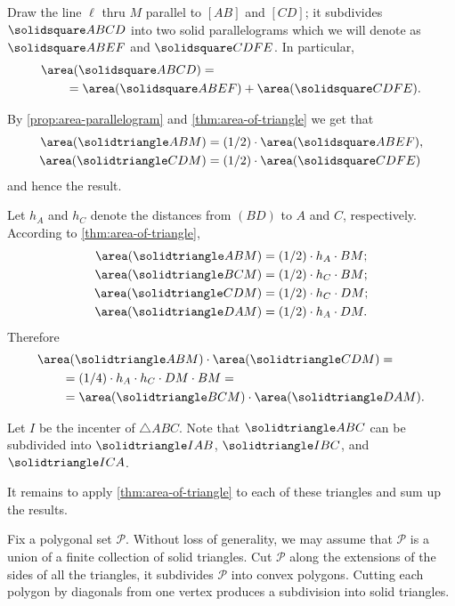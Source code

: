 Draw the line $\ell$ 
thru $M$ parallel to $[AB]$ and $[CD]$;
it subdivides $\solidsquare ABCD$ into two solid parallelograms
which we will denote as
$\solidsquare ABEF$ and
$\solidsquare CDFE$.
In particular,
\begin{align*}
&\area(\solidsquare ABCD)=
\\
&\qquad=
\area(\solidsquare ABEF)+\area(\solidsquare CDFE).
\end{align*}

By \ref{prop:area-parallelogram} and \ref{thm:area-of-triangle} we get that 
\begin{align*}
\area(\solidtriangle ABM)&=\tfrac12\cdot\area(\solidsquare ABEF),
\\
\area(\solidtriangle CDM)&=\tfrac12\cdot\area(\solidsquare CDFE)
\end{align*}
and hence the result.

Let $h_A$ and $h_C$ denote the distances from $(BD)$ to
$A$ and $C$, respectively.
According to \ref{thm:area-of-triangle},
\begin{align*}
\area(\solidtriangle ABM)&=\tfrac12\cdot h_A\cdot BM;
\\
\area(\solidtriangle BCM)&=\tfrac12\cdot h_C\cdot BM;
\\
\area(\solidtriangle CDM)&=\tfrac12\cdot h_C\cdot DM;
\\
\area(\solidtriangle DAM)&=\tfrac12\cdot h_A\cdot DM.
\end{align*}
Therefore
\begin{align*}
&\area(\solidtriangle ABM)\cdot \area(\solidtriangle CDM)=
\\
&\qquad=\tfrac14 \cdot h_A\cdot h_C\cdot DM\cdot BM=
\\
&\qquad=\area(\solidtriangle BCM)\cdot \area(\solidtriangle DAM).
\end{align*}

Let $I$ be the incenter of $\triangle ABC$.
Note that $\solidtriangle ABC$
can be subdivided into 
$\solidtriangle IAB$, 
$\solidtriangle IBC$,
and $\solidtriangle ICA$.

It remains to apply \ref{thm:area-of-triangle} 
to each of these triangles and sum up the results.

 Fix a polygonal set $\mathcal{P}$.
Without loss of generality, we may assume that $\mathcal{P}$ is a union of a finite collection of solid triangles.
Cut $\mathcal{P}$ along the extensions of the sides of all the triangles,
it subdivides $\mathcal{P}$ into convex polygons.
Cutting each polygon by diagonals from one vertex produces a subdivision into solid triangles.


